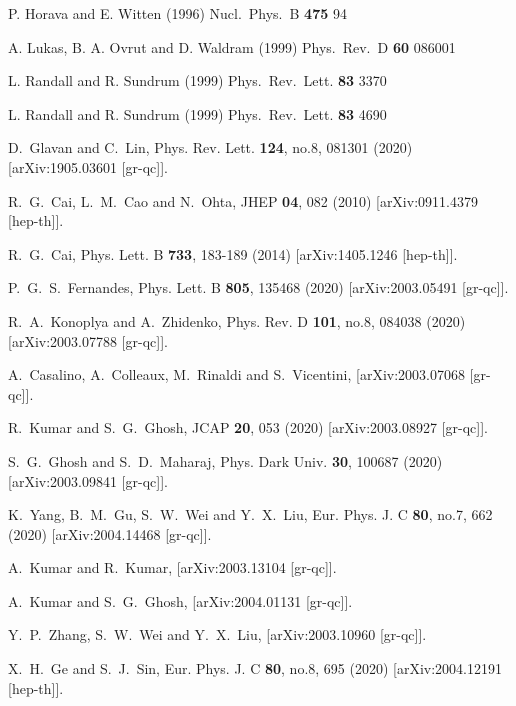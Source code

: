 \documentclass[aps,11pt]{revtex4}
\begin{document}
\begin{thebibliography}{99}
{

  P. Horava and E. Witten (1996) Nucl.\ Phys.\ B {\bf 475} 94

  A. Lukas, B. A. Ovrut and D. Waldram (1999) Phys.\ Rev.\ D {\bf 60} 086001

  L. Randall and R. Sundrum (1999) Phys.\ Rev.\ Lett.  {\bf 83} 3370

  L. Randall and R. Sundrum (1999) Phys.\ Rev.\ Lett.  {\bf 83} 4690

D.~Glavan and C.~Lin,
Phys. Rev. Lett. \textbf{124}, no.8, 081301 (2020)
[arXiv:1905.03601 [gr-qc]].


R.~G.~Cai, L.~M.~Cao and N.~Ohta,
JHEP \textbf{04}, 082 (2010)
[arXiv:0911.4379 [hep-th]].


R.~G.~Cai,
Phys. Lett. B \textbf{733}, 183-189 (2014)
[arXiv:1405.1246 [hep-th]].


P.~G.~S.~Fernandes,
Phys. Lett. B \textbf{805}, 135468 (2020) [arXiv:2003.05491 [gr-qc]].


R.~A.~Konoplya and A.~Zhidenko,
Phys. Rev. D \textbf{101}, no.8, 084038 (2020)
[arXiv:2003.07788 [gr-qc]].


A.~Casalino, A.~Colleaux, M.~Rinaldi and S.~Vicentini,
[arXiv:2003.07068 [gr-qc]].


R.~Kumar and S.~G.~Ghosh,
JCAP \textbf{20}, 053 (2020)
[arXiv:2003.08927 [gr-qc]].


S.~G.~Ghosh and S.~D.~Maharaj,
Phys. Dark Univ. \textbf{30}, 100687 (2020)
[arXiv:2003.09841 [gr-qc]].


K.~Yang, B.~M.~Gu, S.~W.~Wei and Y.~X.~Liu,
Eur. Phys. J. C \textbf{80}, no.7, 662 (2020)
[arXiv:2004.14468 [gr-qc]].


A.~Kumar and R.~Kumar,
[arXiv:2003.13104 [gr-qc]].


A.~Kumar and S.~G.~Ghosh,
[arXiv:2004.01131 [gr-qc]].


Y.~P.~Zhang, S.~W.~Wei and Y.~X.~Liu,
[arXiv:2003.10960 [gr-qc]].


X.~H.~Ge and S.~J.~Sin,
Eur. Phys. J. C \textbf{80}, no.8, 695 (2020)
[arXiv:2004.12191 [hep-th]].


}
\end{thebibliography}
\end{document}
